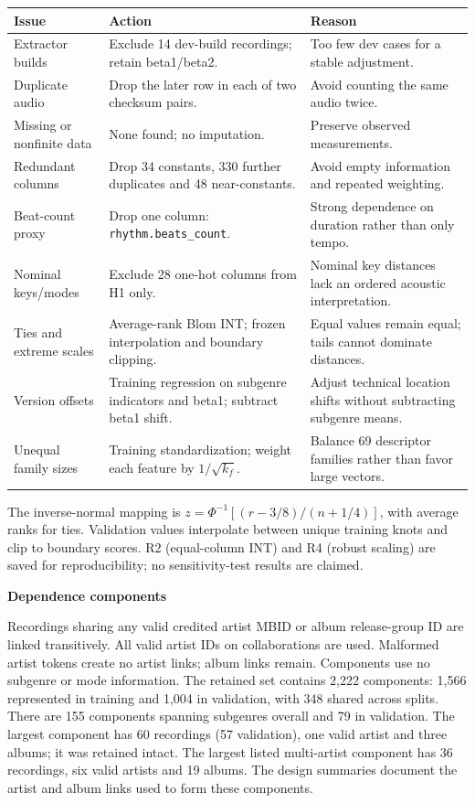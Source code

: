 \documentclass[10pt,a4paper,twocolumn]{article}
\newcommand{\minihead}[1]{\par\needspace{6\baselineskip}\smallskip\textbf{#1}\par}
\begin{document}
{\small\begin{tabularx}{\linewidth}{@{}L{1.9cm} Y Y@{}}\toprule
Issue & Action & Reason\\\midrule
Extractor builds & Exclude 14 dev-build recordings; retain beta1/beta2. & Too few dev cases for a stable adjustment.\\
Duplicate audio & Drop the later row in each of two checksum pairs. & Avoid counting the same audio twice.\\
Missing or nonfinite data & None found; no imputation. & Preserve observed measurements.\\
Redundant columns & Drop 34 constants, 330 further duplicates and 48 near-constants. & Avoid empty information and repeated weighting.\\
Beat-count proxy & Drop one column: \texttt{rhythm.}\newline\texttt{beats\_count}. & Strong dependence on duration rather than only tempo.\\
Nominal keys/modes & Exclude 28 one-hot columns from H1 only. & Nominal key distances lack an ordered acoustic interpretation.\\
Ties and extreme scales & Average-rank Blom INT; frozen interpolation and boundary clipping. & Equal values remain equal; tails cannot dominate distances.\\
Version offsets & Training regression on subgenre indicators and beta1; subtract beta1 shift. & Adjust technical location shifts without subtracting subgenre means.\\
Unequal family sizes & Training standardization; weight each feature by $1/\sqrt{k_f}$. & Balance 69 descriptor families rather than favor large vectors.\\\bottomrule
\end{tabularx}}
The inverse-normal mapping is $z=\Phi^{-1}[(r-3/8)/(n+1/4)]$, with average ranks for ties. Validation values interpolate between unique training knots and clip to boundary scores. R2 (equal-column INT) and R4 (robust scaling) are saved for reproducibility; no sensitivity-test results are claimed.

\minihead{Dependence components}
Recordings sharing any valid credited artist MBID or album release-group ID are linked transitively. All valid artist IDs on collaborations are used. Malformed artist tokens create no artist links; album links remain. Components use no subgenre or mode information.
The retained set contains 2,222 components: 1,566 represented in training and 1,004 in validation, with 348 shared across splits. There are 155 components spanning subgenres overall and 79 in validation. The largest component has 60 recordings (57 validation), one valid artist and three albums; it was retained intact. The largest listed multi-artist component has 36 recordings, six valid artists and 19 albums. The design summaries document the artist and album links used to form these components.
\end{document}
